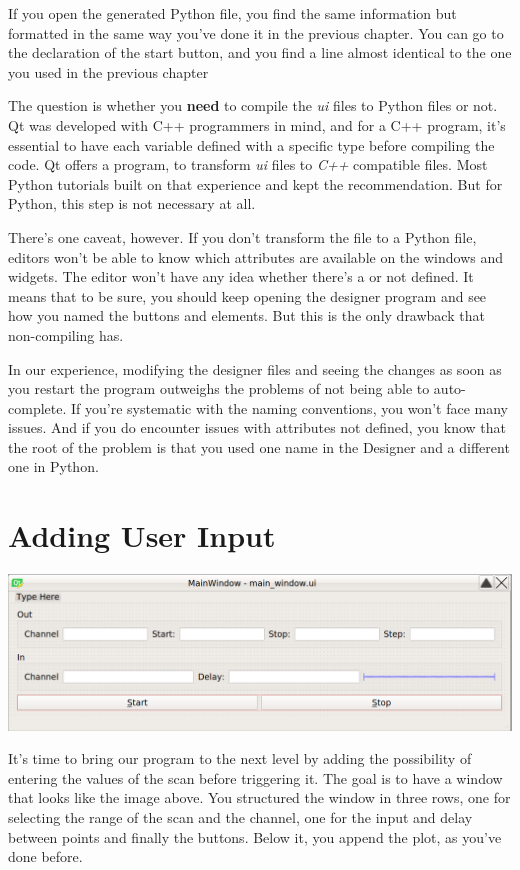 If you open the generated Python file, you find the same information but formatted in the same way you've done it in the previous chapter. You can go to the declaration of the start button, and you find a line almost identical to the one you used in the previous chapter


The question is whether you \textbf{need} to compile the \emph{ui} files to Python files or not. Qt was developed with C++ programmers in mind, and for a C++ program, it's essential to have each variable defined with a specific type before compiling the code. Qt offers a program,  to transform \emph{ui} files to \emph{C++} compatible files. Most Python tutorials built on that experience and kept the recommendation. But for Python, this step is not necessary at all.

There's one caveat, however. If you don't transform the file to a Python file, editors won't be able to know which attributes are available on the windows and widgets. The editor won't have any idea whether there's a  or not defined. It means that to be sure, you should keep opening the designer program and see how you named the buttons and elements. But this is the only drawback that non-compiling has.

In our experience, modifying the designer files and seeing the changes as soon as you restart the program outweighs the problems of not being able to auto-complete. If you're systematic with the naming conventions, you won't face many issues. And if you do encounter issues with attributes not defined, you know that the root of the problem is that you used one name in the Designer and a different one in Python.

\section{Adding User Input}\label{sec:adding-user-input}
\begin{center}
    \includegraphics[width=.5\textwidth]{images/Chapter_09/08_final_window_example.png}
\end{center}

It's time to bring our program to the next level by adding the possibility of entering the values of the scan before triggering it. The goal is to have a window that looks like the image above. You structured the window in three rows, one for selecting the range of the scan and the channel, one for the input and delay between points and finally the buttons. Below it, you append the plot, as you've done before.

